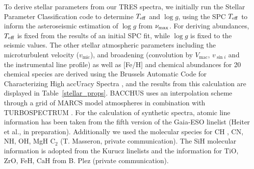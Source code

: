 \documentclass[a4paper,fleqn,usenatbib]{mnras}
\newcommand{\numax}{\mbox{$\nu_{\rm max}$}\xspace}
\newcommand{\teff}{\mbox{$T_{\rm eff}$}\xspace}
\newcommand{\logg}{\mbox{$\log g$}\xspace}
\begin{document}
To derive stellar parameters from our TRES spectra, we initially run the Stellar Parameter Classification \citep[SPC:][]{spc} code to determine \teff and \logg, using the SPC \teff to inform the asteroseismic estimation of \logg from \numax. For deriving abundances, \teff is fixed from the results of an initial SPC fit, while \logg is fixed to the seismic values. The other stellar atmospheric parameters including the microturbulent velocity ($v_{\text{mic}}$), and broadening (convolution by $V_{\text{mac}}$, $v_{\sin{i}}$ and the instrumental line profile) as well as [Fe/H] and chemical abundances for 20 chemical species are derived using the Brussels Automatic Code for Characterizing High accUracy Spectra \citep[BACCHUS:][]{bacchus}, and the results from this calculation are displayed in Table~\ref{stellar_props}. BACCHUS uses an interpolation scheme through a grid of MARCS model atmospheres \citep{Gustafsson2008} in combination with TURBOSPECTRUM \citep{Alvarez1998, Plez2012}. For the calculation of synthetic spectra, atomic line information has been taken from the fifth version of the Gaia-ESO linelist (Heiter et al., in preparation). Additionally we used the molecular species for CH \citep{Masseron2014}, CN, NH, OH, MgH  C$_{2}$ (T. Masseron, private communication). The SiH molecular information is adopted from the Kurucz linelists and the information for TiO, ZrO, FeH, CaH from B. Plez (private communication). 
\end{document}
